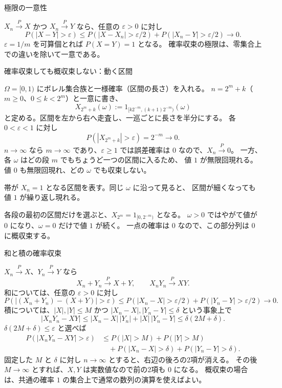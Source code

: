 \documentclass[a4paper,10pt,pdflatex,ja=standard,jafont=ipaex-type1,
  magstyle=real,scale=1]{bxjsarticle}
\newcommand{\topic}[1]{\par\vspace{5pt}
  {\large\sffamily\mdseries\color{accent}#1}\par\vspace{2pt}}
\newcommand{\ind}{\mathrm{1}}
\begin{document}
\topic{極限の一意性}
$X_n\xrightarrow{P}X$ かつ $X_n\xrightarrow{P}Y$ なら、任意の $\varepsilon>0$ に対し
$$P(|X-Y|>\varepsilon)
 \le P(|X-X_n|>\varepsilon/2)+P(|X_n-Y|>\varepsilon/2)\to0.$$
$\varepsilon=1/m$ を可算個とれば $P(X=Y)=1$ となる。
確率収束の極限は、零集合上での違いを除いて一意である。

\newpage
\topic{確率収束しても概収束しない：動く区間}
$\Omega=[0,1)$ にボレル集合族と一様確率（区間の長さ）を入れる。
$n=2^m+k$（$m\ge0$、$0\le k<2^m$）と一意に書き、
$$X_{2^m+k}(\omega):=\ind_{[k2^{-m},(k+1)2^{-m})}(\omega)$$
と定める。区間を左から右へ走査し、一巡ごとに長さを半分にする。
各 $0<\varepsilon<1$ に対し
$$P(|X_{2^m+k}|>\varepsilon)=2^{-m}\longrightarrow0.$$
$n\to\infty$ なら $m\to\infty$ であり、$\varepsilon\ge1$ では誤差確率は $0$ なので、$X_n\xrightarrow{P}0$。
一方、各 $\omega$ はどの段 $m$ でもちょうど一つの区間に入るため、
値 $1$ が無限回現れる。値 $0$ も無限回現れ、どの $\omega$ でも収束しない。

\begin{center}
\end{center}
{\small\color{muted}帯が $X_n=1$ となる区間を表す。同じ $\omega$ に沿って見ると、
区間が細くなっても値 $1$ が繰り返し現れる。}\par

各段の最初の区間だけを選ぶと、$X_{2^m}=\ind_{[0,2^{-m})}$ となる。
$\omega>0$ ではやがて値が $0$ になり、$\omega=0$ だけで値 $1$ が続く。
一点の確率は $0$ なので、この部分列は $0$ に概収束する。

\topic{和と積の確率収束}
$X_n\xrightarrow{P}X$、$Y_n\xrightarrow{P}Y$ なら
$$X_n+Y_n\xrightarrow{P}X+Y,\qquad X_nY_n\xrightarrow{P}XY.$$
和については、任意の $\varepsilon>0$ に対し
$$P(|(X_n+Y_n)-(X+Y)|>\varepsilon)
 \le P(|X_n-X|>\varepsilon/2)+P(|Y_n-Y|>\varepsilon/2)\to0.$$
積については、$|X|,|Y|\le M$ かつ
$|X_n-X|,|Y_n-Y|\le\delta$ という事象上で
$$|X_nY_n-XY|
 \le|X_n-X|\,|Y_n|+|X|\,|Y_n-Y|
 \le\delta(2M+\delta).$$
$\delta(2M+\delta)\le\varepsilon$ と選べば
$$
 \begin{aligned}
 P(|X_nY_n-XY|>\varepsilon)
 &\le P(|X|>M)+P(|Y|>M)\\
 &\quad+P(|X_n-X|>\delta)+P(|Y_n-Y|>\delta).
 \end{aligned}
$$
固定した $M$ と $\delta$ に対し $n\to\infty$ とすると、右辺の後ろの2項が消える。
その後 $M\to\infty$ とすれば、$X,Y$ は実数値なので前の2項も $0$ になる。
概収束の場合は、共通の確率 $1$ の集合上で通常の数列の演算を使えばよい。
\end{document}
